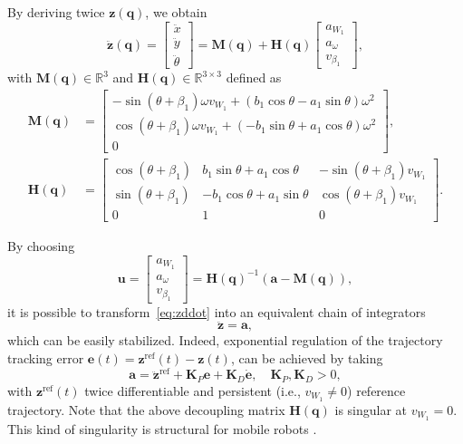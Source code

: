 By deriving twice $\bm{z}(\bm{q})$, we obtain
\begin{equation}
\label{eq:zddot}
    \ddot{\bm{z}}(\bm{q})
    =
    \begin{bmatrix}
        \ddot{x} \\ \ddot{y} \\ \ddot{\theta}
    \end{bmatrix}
    =
    \bm{M}(\bm{q}) +
    \bm{H}(\bm{q})
    \begin{bmatrix}
        a_{W_1} \\ a_{\omega} \\ v_{\beta_1}
    \end{bmatrix},
\end{equation}
with $\bm{M}(\bm{q}) \in \mathbb{R}^3$ and $\bm{H}(\bm{q}) \in \mathbb{R}^{3 \times 3}$ defined as
\begin{align*}
    \bm{M}(\bm{q})
    &=
    \begin{bmatrix}
        -\sin(\theta+\beta_1) \omega v_{W_1} + ( b_1 \cos\theta - a_1 \sin\theta) \omega^2 \\
         \cos(\theta+\beta_1) \omega v_{W_1} + (-b_1 \sin\theta + a_1 \cos\theta) \omega^2 \\
        0
    \end{bmatrix}, \\
    \bm{H}(\bm{q})
    &=
    \begin{bmatrix}
        \cos(\theta+\beta_1) &  b_1 \sin\theta + a_1 \cos\theta & -\sin(\theta+\beta_1) v_{W_1} \\
        \sin(\theta+\beta_1) & -b_1 \cos\theta + a_1 \sin\theta &  \cos(\theta+\beta_1) v_{W_1} \\
        0 & 1 & 0
    \end{bmatrix}.
\end{align*}

By choosing
\begin{equation*}
    \bm{u} = \begin{bmatrix}
        a_{W_1} \\ a_{\omega} \\ v_{\beta_1}
    \end{bmatrix}
    = \bm{H}(\bm{q})^{-1} \left(\bm{a} - \bm{M}(\bm{q})\right),
\end{equation*}
it is possible to transform~\eqref{eq:zddot} into an equivalent chain of integrators
\begin{equation*}
    \ddot{\bm{z}} = \bm{a},
\end{equation*}
which can be easily stabilized. Indeed, exponential regulation of the trajectory tracking error $\bm{e}(t) = \bm{z}^{\mathrm{ref}}(t)-\bm{z}(t)$, can be achieved by taking
\begin{equation*}
    \bm{a} = \ddot{\bm{z}}^{\mathrm{ref}} + \bm{K}_P \bm{e} + \bm{K}_D \dot{\bm{e}}, \quad \bm{K}_P, \bm{K}_D > 0,
\end{equation*}
with $\bm{z}^{\mathrm{ref}}(t)$ twice differentiable and persistent (i.e., $v_{W_1} \ne 0$) reference trajectory. Note that the above decoupling matrix $\bm{H}(\bm{q})$ is singular at $v_{W_1} = 0$. This kind of singularity is structural for mobile robots \cite{Oriolo2002WMRControlDFL}.

